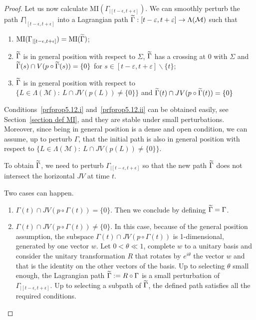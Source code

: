 \documentclass[AHL, Unicode, longabstracts, published]{cedram}
\newcommand*\M{\mathcal{M}}
\newcommand{\MI}{\mathrm{MI}}
\newcommand*{\romanenumi}{\renewcommand*{\theenumi}{\roman{enumi}}}
\let\oldtilde\tilde
\renewcommand*{\tilde}[1]{\mathchoice{\widetilde{#1}}{\widetilde{#1}}{\oldtilde{#1}}{\oldtilde{#1}}}
\begin{document}
\begin{proof}
Let us now calculate $\MI(\Gamma_{|[t-\epsilon,t+\epsilon]})$. We can smoothly perturb the path $\Gamma|_{[t-\epsilon,t+\epsilon]}$ into a Lagrangian path $\tilde\Gamma:{[t-\varepsilon,t+\varepsilon] }\to \Lambda(\M)$ such that
\begin{enumerate}\romanenumi
\item\label{prfprop5.12.i} $\MI(\Gamma_{|[t-\epsilon, t+\epsilon]})=\MI(\tilde\Gamma)$;

\item\label{prfprop5.12.ii} $\tilde\Gamma$ is in general position with respect to $\Sigma$, $\tilde\Gamma$ has a crossing at $0$ with $\Sigma$ and $\tilde\Gamma(s)\cap V(p\circ\tilde\Gamma(s))=\{0\}$ for ${ s\in[t-\varepsilon,t+\varepsilon]\backslash \{ t\} }$; 

\item\label{prfprop5.12.iii} $\tilde\Gamma$ is in general position with respect to $\{L\in\Lambda(\M) :\ L\cap JV(p(L))\neq \{0\}\}$ and $\tilde\Gamma(t)\cap JV(p\circ\tilde\Gamma(t))=\{0\}$
\end{enumerate}


Conditions~\eqref{prfprop5.12.i} and~\eqref{prfprop5.12.ii} can be obtained easily, see Section~\ref{section def MI}, and they are stable under small perturbations. Moreover, since being in general position is a dense and open condition, we can assume, up to perturb $\Gamma$, that the initial path is also in general position with respect to $\{L\in\Lambda(\M) :\ L\cap JV(p(L))\neq \{0\}\}$.

To obtain $\tilde\Gamma$, we need to perturb $\Gamma_{|[t-\epsilon,t+\epsilon]}$ so that the new path $\tilde\Gamma$ does not intersect the horizontal $JV$ at { time $t$}.

Two cases can happen.
\begin{enumerate}
\item\label{prfprop5.12.1} $\Gamma(t)\cap JV(p\circ\Gamma(t))=\{0\}$. Then we conclude by defining { $\tilde\Gamma=\Gamma$}.

\item\label{prfprop5.12.2} $\Gamma(t)\cap JV(p\circ\Gamma(t))\neq \{0\}$. In this case, because of the general position assumption, the subspace $\Gamma(t)\cap JV(p\circ\Gamma(t))$ is 1-dimensional, generated by one vector $w$. Let $0<\theta \ll 1$, complete $w$ to a {unitary} basis and consider the unitary transformation $R$ that rotates by $e^{i\theta}$ the vector $w$ and that is the identity on the other vectors {of the basis}. Up to selecting $\theta$ small enough, the Lagrangian path {$\tilde\Gamma := R\circ\Gamma $ } is a small perturbation of $\Gamma_{|[t-\epsilon,t+\epsilon]}$. Up to selecting a subpath of $\tilde\Gamma$, the defined path satisfies all the required conditions.
\end{enumerate}


\end{proof}
\end{document}
